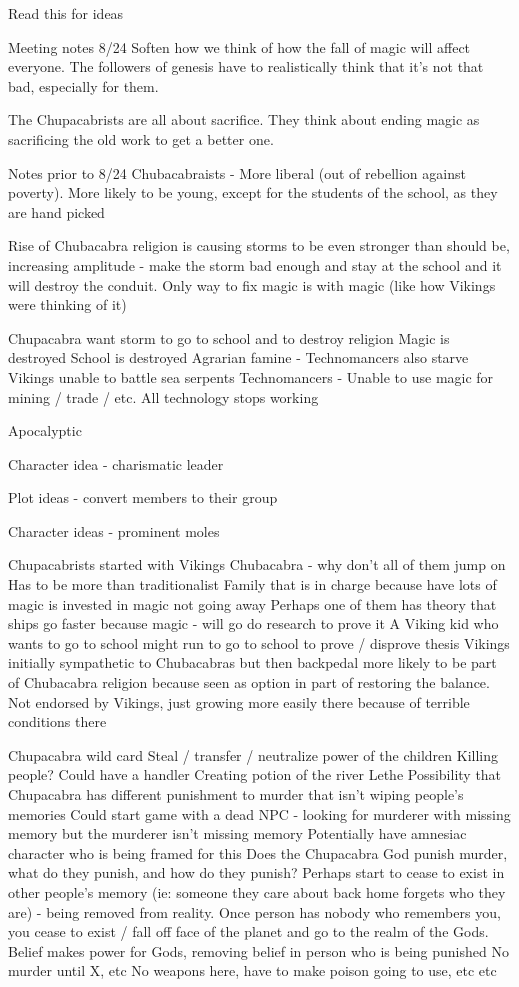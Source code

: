 \documentclass[blue]{GL2020}
\begin{document}
Read this for ideas \/

Meeting notes 8/24
Soften how we think of how the fall of magic will affect everyone. The followers of genesis have to realistically think that it’s not that bad, especially for them.

The Chupacabrists are all about sacrifice. They think about ending magic as sacrificing the old work to get a better one.

Notes prior to 8/24
Chubacabraists - More liberal (out of rebellion against poverty). More likely to be young, except for the students of the school, as they are hand picked

Rise of Chubacabra religion is causing storms to be even stronger than should be, increasing amplitude - make the storm bad enough and stay at the school and it will destroy the conduit.  Only way to fix magic is with magic (like how Vikings were thinking of it)

Chupacabra want storm to go to school and to destroy religion
Magic is destroyed
School is destroyed
Agrarian famine - Technomancers also starve
Vikings unable to battle sea serpents
Technomancers - Unable to use magic for mining / trade / etc.  All technology stops working

Apocalyptic

Character idea - charismatic leader

Plot ideas - convert members to their group

Character ideas - prominent moles

Chupacabrists started with Vikings
Chubacabra - why don’t all of them jump on
Has to be more than traditionalist
Family that is in charge because have lots of magic is invested in magic not going away
Perhaps one of them has theory that ships go faster because magic - will go do research to prove it
A Viking kid who wants to go to school might run to go to school to prove / disprove thesis
Vikings initially sympathetic to Chubacabras but then backpedal
more likely to be part of Chubacabra religion because seen as option in part of restoring the balance.  Not endorsed by Vikings, just growing more easily there because of terrible conditions there

Chupacabra wild card
Steal / transfer / neutralize power of the children
Killing people?  Could have a handler
Creating potion of the river Lethe
Possibility that Chupacabra has different punishment to murder that isn’t wiping people’s memories
Could start game with a dead NPC - looking for murderer with missing memory but the murderer isn’t missing memory
Potentially have amnesiac character who is being framed for this
Does the Chupacabra God punish murder, what do they punish, and how do they punish?
Perhaps start to cease to exist in other people’s memory (ie: someone they care about back home forgets who they are) - being removed from reality.  Once person has nobody who remembers you, you cease to exist / fall off face of the planet and go to the realm of the Gods.
Belief makes power for Gods, removing belief in person who is being punished
No murder until X, etc
No weapons here, have to make poison going to use, etc etc
\end{document}
